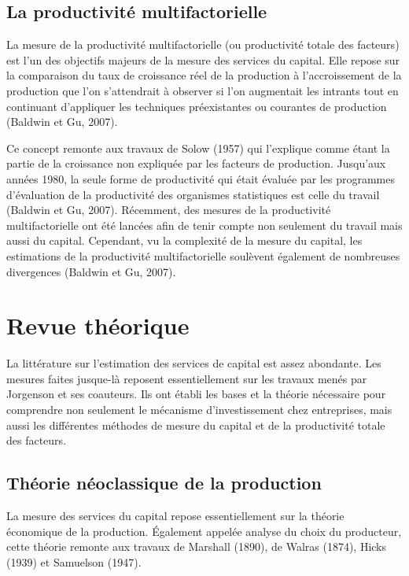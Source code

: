 \documentclass[12pt,a4paper,oneside]{report}
\begin{document}
\subsection{La productivité multifactorielle}

La mesure de la productivité multifactorielle (ou productivité totale des facteurs) est l’un des objectifs
majeurs de la mesure des services du capital. Elle repose sur la comparaison du taux de croissance réel de la
production à l’accroissement de la production que l’on s’attendrait à observer si l’on augmentait les intrants
tout en continuant d’appliquer les techniques préexistantes ou courantes de production (Baldwin et Gu, 2007).

Ce concept remonte aux travaux de Solow (1957) qui l'explique comme étant la partie de la croissance non expliquée par les facteurs de production. Jusqu’aux années 1980, la seule forme de productivité qui était évaluée par les programmes d’évaluation de la
productivité des organismes statistiques est celle du travail (Baldwin et Gu, 2007). Récemment, des mesures de
la productivité multifactorielle ont été lancées afin de tenir compte non seulement du travail mais aussi du
capital. Cependant, vu la complexité de la mesure du capital, les estimations de la productivité
multifactorielle soulèvent également de nombreuses divergences (Baldwin et Gu, 2007).

\section{Revue théorique}

La littérature sur l’estimation des services de capital est assez abondante. Les mesures faites jusque-là
reposent essentiellement sur les travaux menés par Jorgenson et ses coauteurs. Ils ont établi les bases et la
théorie nécessaire pour comprendre non seulement le mécanisme d’investissement chez entreprises, mais aussi
les différentes méthodes de mesure du capital et de la productivité totale des facteurs.

\subsection{Théorie néoclassique de la production}

La mesure des services du capital repose essentiellement sur la théorie économique de la production. Également
appelée analyse du choix du producteur, cette théorie remonte aux travaux de Marshall (1890), de Walras
(1874), Hicks (1939) et Samuelson (1947).
\end{document}
